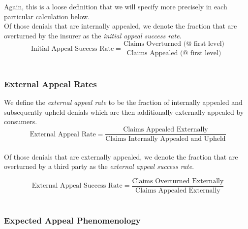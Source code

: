 \documentclass[12pt, a4paper]{report}
\begin{document}
Again, this is a loose definition that we will specify more precisely in each particular calculation below.\\

Of those denials that are internally appealed, we denote the fraction that are overturned by the insurer as the \emph{initial appeal success rate}.\\
	
\begin{equation*}
	\text{Initial Appeal Success Rate} = \dfrac{\text{Claims Overturned (@ first level)}}{\text{Claims Appealed (@ first level)}}
\end{equation*}
\hfill\\
	

\subsubsection{External Appeal Rates}

We define the \emph{external appeal rate} to be the fraction of internally appealed and subsequently upheld denials which are then additionally externally appealed by consumers.\\

\begin{equation*}
	\text{External Appeal Rate} = \dfrac{\text{Claims Appealed Externally}}{\text{Claims Internally Appealed and Upheld}}
\end{equation*}
\hfill\\


Of those denials that are externally appealed, we denote the fraction that are overturned by a third party as the \emph{external appeal success rate}.

\begin{equation*}
	\text{External Appeal Success Rate} = \dfrac{\text{Claims Overturned Externally}}{\text{Claims Appealed Externally}}
\end{equation*}
\hfill\\


\subsubsection{Expected Appeal Phenomenology}
\end{document}
